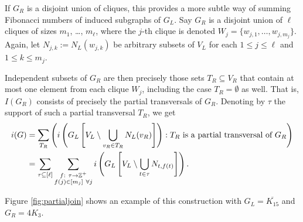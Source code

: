 \documentclass[10pt,a4paper]{article}
\numberwithin{equation}{section}
\newcommand{\zz}{\mathbb{Z}}
\begin{document}
\begin{example}\label{ex:multiplecliques}
If $G_R$ is a disjoint union of cliques, this provides a more subtle way of summing Fibonacci numbers of induced subgraphs of $G_L$. Say $G_R$ is a disjoint union of $\ell$ cliques of sizes $m_1$, \ldots, $m_{\ell}$, where the $j$-th clique is denoted $W_j=\{w_{j,1}, \ldots, w_{j,m_j}\}$. Again, let $N_{j,k}:=N_L(w_{j,k})$ be arbitrary subsets of $V_L$ for each $1\le j\le \ell$ and $1\le k\le m_j$.

Independent subsets of $G_R$ are then precisely those sets $T_R\subseteq V_R$ that contain at most one element from each clique $W_j$, including the case $T_R=\emptyset$ as well. That is, $I(G_R)$ consists of precisely the partial transversals of $G_R$. Denoting by $\tau$ the support of such a partial transversal $T_R$, we get
\begin{align}
i(G) &= \sum_{T_R} \left(i\left(G_L\left[V_L\setminus \bigcup_{v_R\in T_R} N_L(v_R)\right]\right): \text{$T_R$ is a partial transversal of $G_R$}\right)\notag\\
~ &= \sum_{\tau\subseteq [\ell]}  \sum_{\substack{f:~\tau\to \zz^{+} \\ f(j)\in [m_j] ~\forall j}} i\left(G_L\left[V_L\setminus \bigcup_{t\in \tau} N_{t,f(t)}\right]\right).\label{eq:disjointtrick}
\end{align}

\noindent Figure \ref{fig:partialjoin} shows an example of this construction with $G_L=\overline{K_{15}}$ and $G_R=4K_3$.


\end{example}
\end{document}
